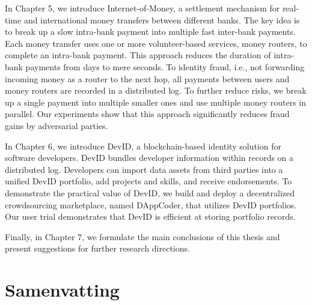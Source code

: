In Chapter 5, we introduce Internet-of-Money, a settlement mechanism for real-time and international money transfers between different banks.
The key idea is to break up a slow intra-bank payment into multiple fast inter-bank payments.
Each money transfer uses one or more volunteer-based services, money routers, to complete an intra-bank payment.
This approach reduces the duration of intra-bank payments from days to mere seconds.
To identity fraud, i.e., not forwarding incoming money as a router to the next hop, all payments between users and money routers are recorded in a distributed log.
To further reduce risks, we break up a single payment into multiple smaller ones and use multiple money routers in parallel.
Our experiments show that this approach significantly reduces fraud gains by adversarial parties.

In Chapter 6, we introduce DevID, a blockchain-based identity solution for software developers.
DevID bundles developer information within records on a distributed log.
Developers can import data assets from third parties into a unified DevID portfolio, add projects and skills, and receive endorsements.
To demonstrate the practical value of DevID, we build and deploy a decentralized crowdsourcing marketplace, named DAppCoder, that utilizes DevID portfolios.
Our user trial demonstrates that DevID is efficient at storing portfolio records.

Finally, in Chapter 7, we formulate the main conclusions of this thesis and present suggestions for further research directions.

\chapter*{Samenvatting}


